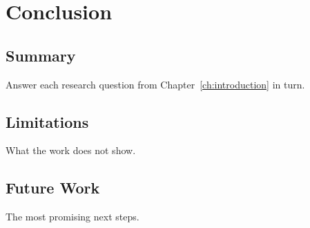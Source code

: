 \chapter{Conclusion}
\label{ch:conclusion}

\section{Summary}
Answer each research question from Chapter~\ref{ch:introduction} in turn.

\section{Limitations}
What the work does not show.

\section{Future Work}
The most promising next steps.
